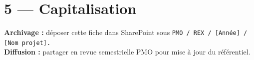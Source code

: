 \documentclass[11pt,a4paper,oneside]{report}
\begin{document}
\section*{5 — Capitalisation}

\begin{reco}
\textbf{Archivage :} déposer cette fiche dans SharePoint sous \texttt{PMO / REX / [Année] / [Nom projet].} \\
\textbf{Diffusion :} partager en revue semestrielle PMO pour mise à jour du référentiel.
\end{reco}
\end{document}
